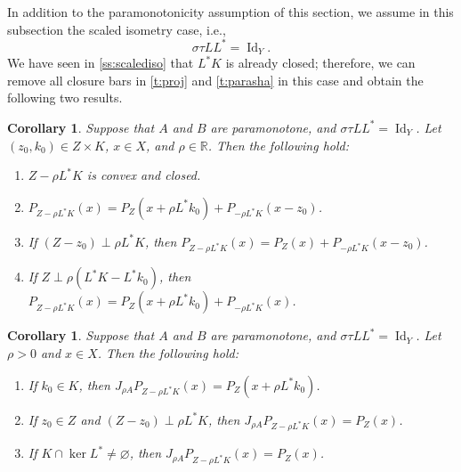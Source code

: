 \documentclass{article}
\newcommand{\RR}{\ensuremath{\mathbb R}}
\newcommand{\Id}{\ensuremath{\operatorname{Id}}}
\newtheorem{corollary}[theorem]{Corollary}
\begin{document}
In addition to the paramonotonicity assumption of this section, we assume in 
this subsection the scaled isometry case, i.e., 
\begin{equation}
\sigma\tau LL^* = \Id_Y. 
\end{equation}
We have seen in \cref{ss:scalediso} that $L^*K$ is already closed; 
therefore, we can remove all closure bars in \cref{t:proj} 
and \cref{t:parasha} in this case 
and obtain the following two results. 

\begin{corollary}\label{c:proj}
Suppose that $A$ and $B$ are paramonotone, 
and $\sigma\tau LL^* = \Id_Y$. 
Let $(z_0,k_0)\in Z\times K$, 
$x\in X$, and $\rho\in\RR$. 
Then the following hold:
\begin{enumerate}
\item\label{c:proj1} 
$Z-\rho{L^*K}$ is convex and closed.
\item\label{c:proj2} 
$P_{Z-\rho{L^*K}}(x)=P_{Z}(x+\rho L^*k_0)+P_{-\rho{L^*K}}(x-z_0)$.
\item\label{c:proj3} 
If $(Z-z_0)\perp \rho L^* K$, 
then $P_{Z-\rho{L^*K}}(x)=P_Z(x)+P_{-\rho{L^*K}}(x-z_0)$.
\item\label{c:proj4} 
If $Z\perp \rho (L^*K- L^*k_0)$, 
then $P_{Z-\rho{L^*K}}(x)= 
P_Z(x+\rho L^* k_0)+P_{-\rho{L^*K}}(x)$.
\end{enumerate}
\end{corollary}

\begin{corollary}\label{c:parasha}
Suppose that $A$ and $B$ are paramonotone, 
and $\sigma\tau LL^* = \Id_Y$. 
Let $\rho>0$ and $x\in X$. 
Then the following hold:
\begin{enumerate}
\item
\label{c:parasha1} 
If $k_0\in K$, then 
$J_{\rho A}P_{Z-\rho{L^*K}}(x)=P_Z(x+\rho L^*k_0)$. 
\item
\label{c:parasha2} 
If $z_0 \in Z$ and  $(Z-z_0)\perp \rho L^*K$, 
then 
$J_{\rho A} P_{Z-\rho{L^*K}}(x)=P_Z(x)$. 
\item 
\label{c:parasha3}
If $K\cap \ker L^*\neq \varnothing$, then 
$J_{\rho A} P_{Z-\rho{L^*K}}(x)=P_Z(x)$. 
\end{enumerate}
\end{corollary}
\end{document}
